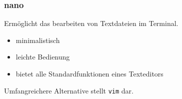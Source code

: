 \documentclass[12pt,utf8]{beamer}
\begin{document}
%				

\begin{frame}
	\frametitle{nano}
	Ermöglicht das bearbeiten von Textdateien im Terminal.
	\begin{itemize}
		\item minimalistisch
		\item leichte Bedienung
		\item bietet alle Standardfunktionen eines Texteditors
	\end{itemize}
	Umfangreichere Alternative stellt \texttt{vim} dar.
\end{frame}
\end{document}
